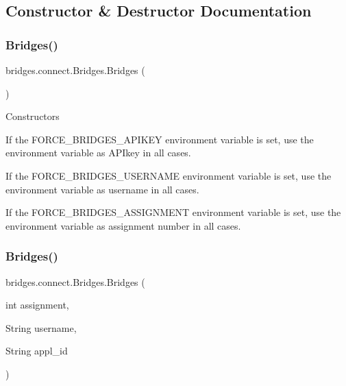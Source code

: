 \subsection{Constructor \& Destructor Documentation}
\mbox{\label{classbridges_1_1connect_1_1_bridges_a42f0592841a829f93453506c78951b1f}} 
\subsubsection{\texorpdfstring{Bridges()}{Bridges()}\hspace{0.1cm}{\footnotesize\ttfamily [1/2]}}
{\footnotesize\ttfamily bridges.\+connect.\+Bridges.\+Bridges (\begin{DoxyParamCaption}{ }\end{DoxyParamCaption})}

Constructors

If the F\+O\+R\+C\+E\+\_\+\+B\+R\+I\+D\+G\+E\+S\+\_\+\+A\+P\+I\+K\+EY environment variable is set, use the environment variable as A\+P\+Ikey in all cases.

If the F\+O\+R\+C\+E\+\_\+\+B\+R\+I\+D\+G\+E\+S\+\_\+\+U\+S\+E\+R\+N\+A\+ME environment variable is set, use the environment variable as username in all cases.

If the F\+O\+R\+C\+E\+\_\+\+B\+R\+I\+D\+G\+E\+S\+\_\+\+A\+S\+S\+I\+G\+N\+M\+E\+NT environment variable is set, use the environment variable as assignment number in all cases. \mbox{\label{classbridges_1_1connect_1_1_bridges_a4c47eb7cbb94c5810dc38c38760db872}} 
\subsubsection{\texorpdfstring{Bridges()}{Bridges()}\hspace{0.1cm}{\footnotesize\ttfamily [2/2]}}
{\footnotesize\ttfamily bridges.\+connect.\+Bridges.\+Bridges (\begin{DoxyParamCaption}\item[{int}]{assignment,  }\item[{String}]{username,  }\item[{String}]{appl\+\_\+id }\end{DoxyParamCaption})}

